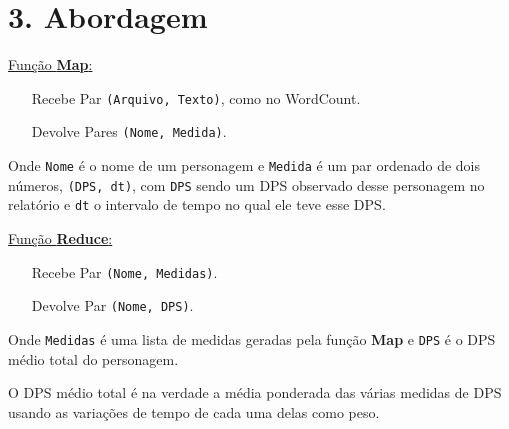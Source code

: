 \documentclass[brazil]{beamer}
\begin{document}

\section{3. Abordagem}


\begin{frame}[fragile]
  \underline{\Large Função \textbf{Map}:}
  
  \vspace{4pt}
  \begin{itemize}
    \pause
    \item[Recebe] Par \verb$(Arquivo, Texto)$, como no WordCount.
    \pause
    \item[Devolve] Pares \verb$(Nome, Medida)$.
  \end{itemize}
  \pause
  \hspace{10pt}
  Onde \verb$Nome$ é o nome de um personagem e \verb$Medida$ é um par ordenado
  de dois números, \verb$(DPS, dt)$, com \verb$DPS$ sendo um DPS observado desse
  personagem no relatório e \verb$dt$ o intervalo de tempo no qual ele teve esse
  DPS.
\end{frame}

\begin{frame}[fragile]
  \underline{\Large Função \textbf{Reduce}:}
  
  \vspace{4pt}
  \begin{itemize}
    \pause
    \item[Recebe] Par \verb$(Nome, Medidas)$.
    \pause
    \item[Devolve] Par \verb$(Nome, DPS)$.
  \end{itemize}
  \pause
  \hspace{10pt}
  Onde \verb$Medidas$ é uma lista de medidas geradas pela função \textbf{Map} e
  \verb$DPS$ é o DPS médio total do personagem.
  
  \pause
  \hspace{10pt}
  O DPS médio total é na verdade a média ponderada das várias medidas de DPS
  usando as variações de tempo de cada uma delas como peso.
\end{frame}
\end{document}

